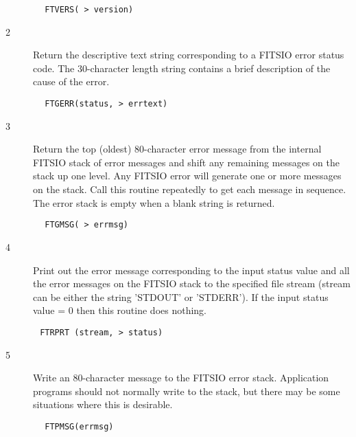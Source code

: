 \documentclass[11pt]{book}
\begin{document}
\begin{verbatim}
        FTVERS( > version)
\end{verbatim}

\begin{description}
\item[2 ] Return the descriptive text string corresponding to a FITSIO error
    status code.   The 30-character length string contains a brief
   description of the cause of the error.
\end{description}

\begin{verbatim}
        FTGERR(status, > errtext)
\end{verbatim}

\begin{description}
\item[3 ] Return the top (oldest) 80-character error message from the
    internal FITSIO stack of error messages and shift any remaining
    messages on the stack up one level.  Any FITSIO error will
    generate one or more messages on the stack.  Call this routine
    repeatedly to get each message in sequence.  The error stack is empty
   when a blank string is returned.
\end{description}

\begin{verbatim}
        FTGMSG( > errmsg)
\end{verbatim}

\begin{description}
\item[4 ] Print out the error message corresponding to the input status
    value and all the error messages on the FITSIO stack  to the specified
    file stream  (stream can be either the string 'STDOUT' or 'STDERR').
   If the input status value = 0 then this routine does nothing.
\end{description}

\begin{verbatim}
       FTRPRT (stream, > status)
\end{verbatim}

\begin{description}
\item[5 ] Write an 80-character message to the FITSIO error stack.  Application
    programs should not normally write to the stack, but there may be
   some situations where this is desirable.
\end{description}

\begin{verbatim}
        FTPMSG(errmsg)
\end{verbatim}
\end{document}
